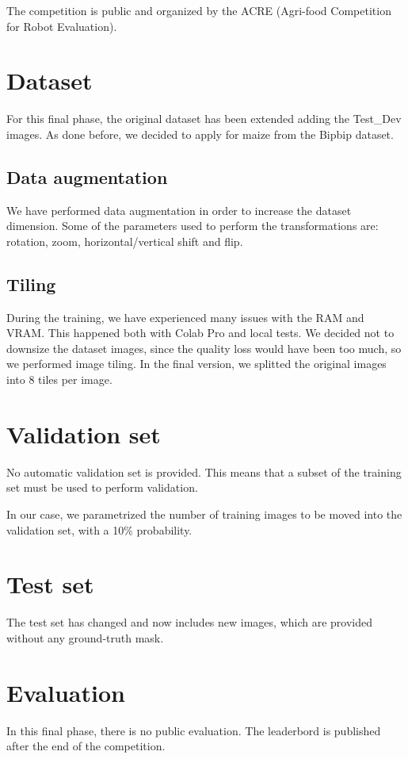 \documentclass[12pt,a4paper]{report}
\begin{document}
The competition is public and  organized by the ACRE (Agri-food Competition for Robot Evaluation).

	\section{Dataset}
For this final phase, the original dataset has been extended adding the Test\_Dev images. As done before, we decided to apply for maize from the Bipbip dataset.
	\subsection{Data augmentation}
We have performed data augmentation in order to increase the dataset dimension. Some of the parameters used to perform the transformations are: rotation, zoom, horizontal/vertical shift and flip.

	\subsection{Tiling}
During the training, we have experienced many issues with the RAM and VRAM. This happened both with Colab Pro and local tests. We decided not to downsize the dataset images, since the quality loss would have been too much, so we performed image tiling. In the final version, we splitted the original images into 8 tiles per image.

	\section{Validation set}

No automatic validation set is provided. This means that a subset of the training set must be used to perform validation.

In our case, we parametrized the number of training images to be moved into the validation set, with a 10\% probability.


	\section{Test set}
The test set has changed and now includes new images, which are provided without any ground-truth mask.
	\section{Evaluation}
In this final phase, there is no public evaluation. The leaderbord is published after the end of the competition.
\end{document}
